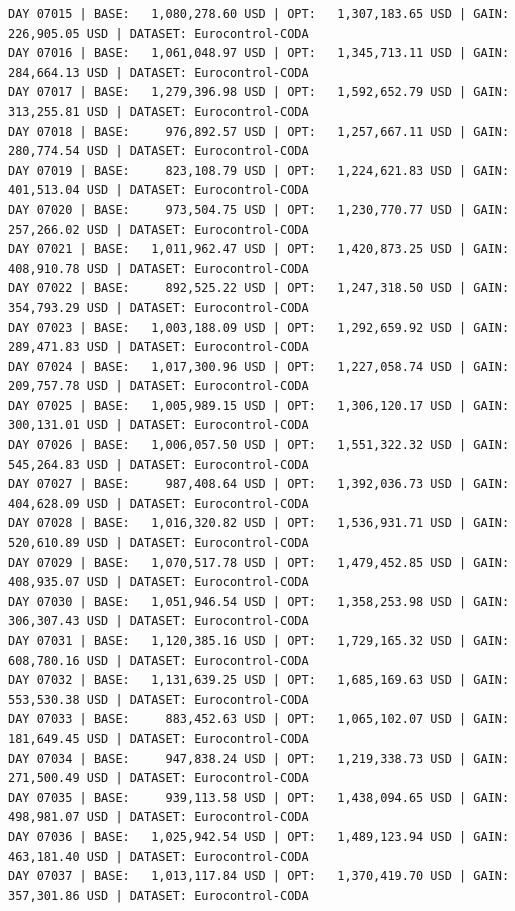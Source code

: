 \documentclass[11pt,a4paper]{article}
\begin{document}
\begin{verbatim}
DAY 07015 | BASE:   1,080,278.60 USD | OPT:   1,307,183.65 USD | GAIN: 226,905.05 USD | DATASET: Eurocontrol-CODA
DAY 07016 | BASE:   1,061,048.97 USD | OPT:   1,345,713.11 USD | GAIN: 284,664.13 USD | DATASET: Eurocontrol-CODA
DAY 07017 | BASE:   1,279,396.98 USD | OPT:   1,592,652.79 USD | GAIN: 313,255.81 USD | DATASET: Eurocontrol-CODA
DAY 07018 | BASE:     976,892.57 USD | OPT:   1,257,667.11 USD | GAIN: 280,774.54 USD | DATASET: Eurocontrol-CODA
DAY 07019 | BASE:     823,108.79 USD | OPT:   1,224,621.83 USD | GAIN: 401,513.04 USD | DATASET: Eurocontrol-CODA
DAY 07020 | BASE:     973,504.75 USD | OPT:   1,230,770.77 USD | GAIN: 257,266.02 USD | DATASET: Eurocontrol-CODA
DAY 07021 | BASE:   1,011,962.47 USD | OPT:   1,420,873.25 USD | GAIN: 408,910.78 USD | DATASET: Eurocontrol-CODA
DAY 07022 | BASE:     892,525.22 USD | OPT:   1,247,318.50 USD | GAIN: 354,793.29 USD | DATASET: Eurocontrol-CODA
DAY 07023 | BASE:   1,003,188.09 USD | OPT:   1,292,659.92 USD | GAIN: 289,471.83 USD | DATASET: Eurocontrol-CODA
DAY 07024 | BASE:   1,017,300.96 USD | OPT:   1,227,058.74 USD | GAIN: 209,757.78 USD | DATASET: Eurocontrol-CODA
DAY 07025 | BASE:   1,005,989.15 USD | OPT:   1,306,120.17 USD | GAIN: 300,131.01 USD | DATASET: Eurocontrol-CODA
DAY 07026 | BASE:   1,006,057.50 USD | OPT:   1,551,322.32 USD | GAIN: 545,264.83 USD | DATASET: Eurocontrol-CODA
DAY 07027 | BASE:     987,408.64 USD | OPT:   1,392,036.73 USD | GAIN: 404,628.09 USD | DATASET: Eurocontrol-CODA
DAY 07028 | BASE:   1,016,320.82 USD | OPT:   1,536,931.71 USD | GAIN: 520,610.89 USD | DATASET: Eurocontrol-CODA
DAY 07029 | BASE:   1,070,517.78 USD | OPT:   1,479,452.85 USD | GAIN: 408,935.07 USD | DATASET: Eurocontrol-CODA
DAY 07030 | BASE:   1,051,946.54 USD | OPT:   1,358,253.98 USD | GAIN: 306,307.43 USD | DATASET: Eurocontrol-CODA
DAY 07031 | BASE:   1,120,385.16 USD | OPT:   1,729,165.32 USD | GAIN: 608,780.16 USD | DATASET: Eurocontrol-CODA
DAY 07032 | BASE:   1,131,639.25 USD | OPT:   1,685,169.63 USD | GAIN: 553,530.38 USD | DATASET: Eurocontrol-CODA
DAY 07033 | BASE:     883,452.63 USD | OPT:   1,065,102.07 USD | GAIN: 181,649.45 USD | DATASET: Eurocontrol-CODA
DAY 07034 | BASE:     947,838.24 USD | OPT:   1,219,338.73 USD | GAIN: 271,500.49 USD | DATASET: Eurocontrol-CODA
DAY 07035 | BASE:     939,113.58 USD | OPT:   1,438,094.65 USD | GAIN: 498,981.07 USD | DATASET: Eurocontrol-CODA
DAY 07036 | BASE:   1,025,942.54 USD | OPT:   1,489,123.94 USD | GAIN: 463,181.40 USD | DATASET: Eurocontrol-CODA
DAY 07037 | BASE:   1,013,117.84 USD | OPT:   1,370,419.70 USD | GAIN: 357,301.86 USD | DATASET: Eurocontrol-CODA

\end{verbatim}
\end{document}
